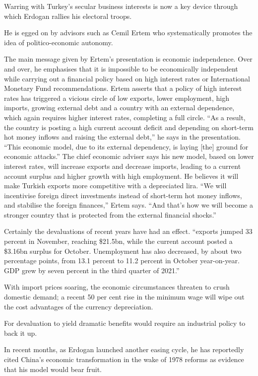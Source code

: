 \documentclass[
]{book}
\begin{document}
Warring with Turkey's secular business interests is now a key device through which Erdogan rallies his electoral troops.

He is egged on by advisors such as Cemil Ertem who systematically promotes the idea of politico-economic autonomy.

The main message given by Ertem's presentation is economic independence. Over and over, he emphasises that it is impossible to be economically independent while carrying out a financial policy based on high interest rates or International Monetary Fund recommendations. Ertem asserts that a policy of high interest rates has triggered a vicious circle of low exports, lower employment, high imports, growing external debt and a country with an external dependence, which again requires higher interest rates, completing a full circle. ``As a result, the country is posting a high current account deficit and depending on short-term hot money inflows and raising the external debt,'' he says in the presentation. ``This economic model, due to its external dependency, is laying {[}the{]} ground for economic attacks.'' The chief economic adviser says his new model, based on lower interest rates, will increase exports and decrease imports, leading to a current account surplus and higher growth with high employment. He believes it will make Turkish exports more competitive with a depreciated lira. ``We will incentivise foreign direct investments instead of short-term hot money inflows, and stabilise the foreign finances,'' Ertem says. ``And that's how we will become a stronger country that is protected from the external financial shocks.''

Certainly the devaluations of recent years have had an effect. ``exports jumped 33 percent in November, reaching \$21.5bn, while the current account posted a \$3.16bn surplus for October. Unemployment has also decreased, by about two percentage points, from 13.1 percent to 11.2 percent in October year-on-year. GDP grew by seven percent in the third quarter of 2021.''

With import prices soaring, the economic circumstances threaten to crush domestic demand; a recent 50 per cent rise in the minimum wage will wipe out the cost advantages of the currency depreciation.

For devaluation to yield dramatic benefits would require an industrial policy to back it up.

In recent months, as Erdogan launched another easing cycle, he has reportedly cited China's economic transformation in the wake of 1978 reforms as evidence that his model would bear fruit.
\end{document}
